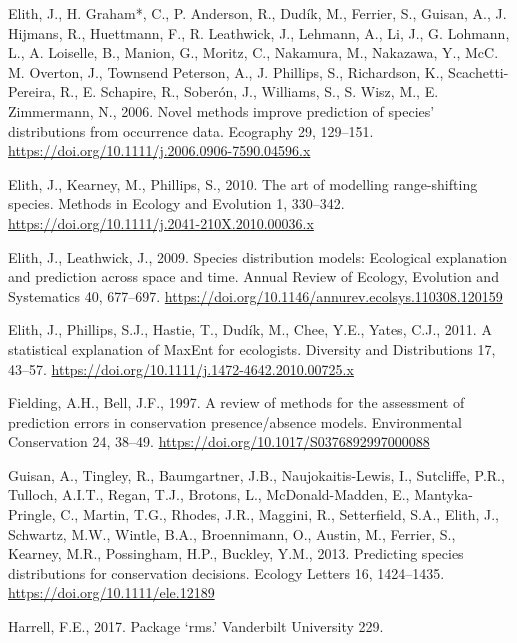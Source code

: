 \documentclass[12pt,]{article}
\begin{document}
\begin{CSLReferences}{1}{0}
\leavevmode\hypertarget{ref-Elith2006}{}%
Elith, J., H. Graham*, C., P. Anderson, R., Dudík, M., Ferrier, S.,
Guisan, A., J. Hijmans, R., Huettmann, F., R. Leathwick, J., Lehmann,
A., Li, J., G. Lohmann, L., A. Loiselle, B., Manion, G., Moritz, C.,
Nakamura, M., Nakazawa, Y., McC. M. Overton, J., Townsend Peterson, A.,
J. Phillips, S., Richardson, K., Scachetti-Pereira, R., E. Schapire, R.,
Soberón, J., Williams, S., S. Wisz, M., E. Zimmermann, N., 2006. Novel
methods improve prediction of species' distributions from occurrence
data. Ecography 29, 129--151.
\url{https://doi.org/10.1111/j.2006.0906-7590.04596.x}

\leavevmode\hypertarget{ref-Elith2010}{}%
Elith, J., Kearney, M., Phillips, S., 2010. The art of modelling
range-shifting species. Methods in Ecology and Evolution 1, 330--342.
\url{https://doi.org/10.1111/j.2041-210X.2010.00036.x}

\leavevmode\hypertarget{ref-Elith2009}{}%
Elith, J., Leathwick, J., 2009. Species distribution models: Ecological
explanation and prediction across space and time. Annual Review of
Ecology, Evolution and Systematics 40, 677--697.
\url{https://doi.org/10.1146/annurev.ecolsys.110308.120159}

\leavevmode\hypertarget{ref-Elith2011}{}%
Elith, J., Phillips, S.J., Hastie, T., Dudík, M., Chee, Y.E., Yates,
C.J., 2011. A statistical explanation of {MaxEnt} for ecologists.
Diversity and Distributions 17, 43--57.
\url{https://doi.org/10.1111/j.1472-4642.2010.00725.x}

\leavevmode\hypertarget{ref-Fielding1997}{}%
Fielding, A.H., Bell, J.F., 1997. A review of methods for the assessment
of prediction errors in conservation presence/absence models.
Environmental Conservation 24, 38--49.
\url{https://doi.org/10.1017/S0376892997000088}

\leavevmode\hypertarget{ref-Guisan2013}{}%
Guisan, A., Tingley, R., Baumgartner, J.B., Naujokaitis-Lewis, I.,
Sutcliffe, P.R., Tulloch, A.I.T., Regan, T.J., Brotons, L.,
McDonald-Madden, E., Mantyka-Pringle, C., Martin, T.G., Rhodes, J.R.,
Maggini, R., Setterfield, S.A., Elith, J., Schwartz, M.W., Wintle, B.A.,
Broennimann, O., Austin, M., Ferrier, S., Kearney, M.R., Possingham,
H.P., Buckley, Y.M., 2013. Predicting species distributions for
conservation decisions. Ecology Letters 16, 1424--1435.
\url{https://doi.org/10.1111/ele.12189}

\leavevmode\hypertarget{ref-Harrell2017package}{}%
Harrell, F.E., 2017. Package {`rms.'} Vanderbilt University 229.


\end{CSLReferences}
\end{document}
